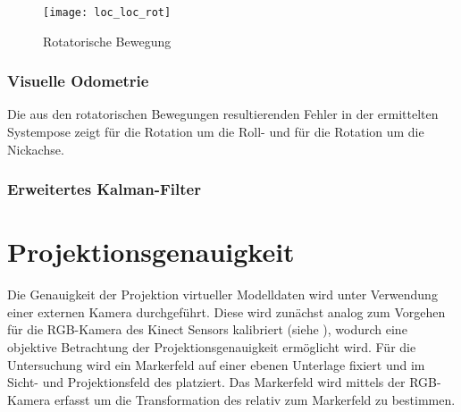 \begin{figure}[!ht]
	\begin{center}
		\texttt{[image: loc\_loc\_rot]}
		\caption{Rotatorische Bewegung}
		\label{fig.rotmove}
	\end{center}
\end{figure}


\subsubsection{Visuelle Odometrie}
Die aus den rotatorischen Bewegungen resultierenden Fehler in der ermittelten Systempose zeigt  für die Rotation um die Roll- und  für die Rotation um die Nickachse.




\subsubsection{Erweitertes Kalman-Filter}






\section{Projektionsgenauigkeit}
Die Genauigkeit der Projektion virtueller Modelldaten wird unter Verwendung einer externen Kamera durchgeführt. Diese wird zunächst analog zum Vorgehen für die RGB-Kamera des Kinect Sensors kalibriert (siehe ), wodurch eine objektive Betrachtung der Projektionsgenauigkeit ermöglicht wird. Für die Untersuchung wird ein Markerfeld auf einer ebenen Unterlage fixiert und im Sicht- und Projektionsfeld des  platziert. Das Markerfeld wird mittels der RGB-Kamera erfasst um die Transformation des  relativ zum Markerfeld zu bestimmen.\\

